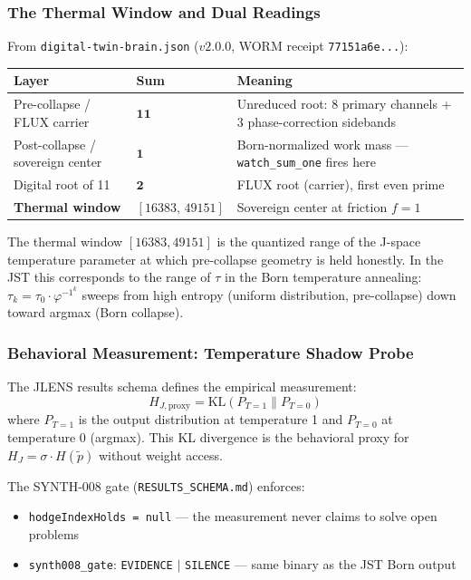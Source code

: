 \documentclass[12pt, letterpaper]{article}
\theoremstyle{plain}
\theoremstyle{definition}
\theoremstyle{remark}
\newcommand{\phiinv}{\varphi^{-1}}
\begin{document}
\subsubsection{The Thermal Window and Dual Readings}

From \texttt{digital-twin-brain.json} ($v2.0.0$, WORM receipt
\texttt{77151a6e...}):

\begin{center}
\small
\renewcommand{\arraystretch}{1.3}
\begin{tabular}{@{}lll@{}}
\toprule
\textbf{Layer} & \textbf{Sum} & \textbf{Meaning} \\
\midrule
Pre-collapse / FLUX carrier & $\mathbf{11}$ &
  Unreduced root: 8 primary channels + 3 phase-correction sidebands \\
Post-collapse / sovereign center & $\mathbf{1}$ &
  Born-normalized work mass — \texttt{watch\_sum\_one} fires here \\
Digital root of 11 & $\mathbf{2}$ &
  FLUX root (carrier), first even prime \\
\textbf{Thermal window} & $[16383,\, 49151]$ &
  Sovereign center at friction $f = 1$ \\
\bottomrule
\end{tabular}
\end{center}

The thermal window $[16383, 49151]$ is the quantized range of the J-space
temperature parameter at which pre-collapse geometry is held honestly.
In the JST this corresponds to the range of $\tau$ in the Born temperature
annealing: $\tau_k = \tau_0 \cdot \phiinv^k$ sweeps from high entropy
(uniform distribution, pre-collapse) down toward argmax (Born collapse).

\subsubsection{Behavioral Measurement: Temperature Shadow Probe}

The JLENS results schema defines the empirical measurement:
\[
  H_{J,\text{proxy}} = \mathrm{KL}(P_{T=1} \| P_{T=0})
\]
where $P_{T=1}$ is the output distribution at temperature 1 and $P_{T=0}$
at temperature 0 (argmax). This KL divergence is the behavioral proxy for
$H_J = \sigma \cdot H(\tilde{p})$ without weight access.

The SYNTH-008 gate (\texttt{RESULTS\_SCHEMA.md}) enforces:
\begin{itemize}[nosep]
  \item \texttt{hodgeIndexHolds = null} — the measurement never claims to solve open problems
  \item \texttt{synth008\_gate}: \texttt{EVIDENCE} $|$ \texttt{SILENCE} — same binary as the JST Born output
\end{itemize}
\end{document}
